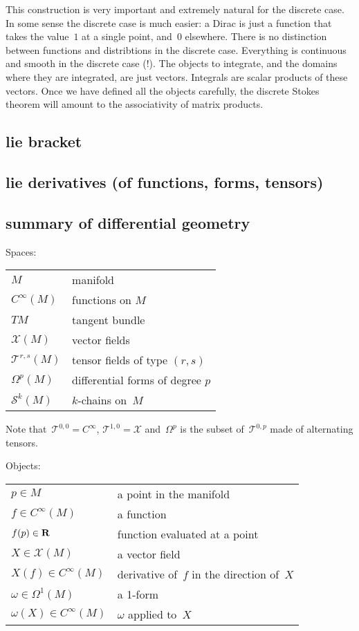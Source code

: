 This construction is very important and extremely natural for the discrete case.
In some sense the discrete case is much easier: a Dirac is just a function
that takes the value~$1$ at a single point, and~$0$ elsewhere.  There is no
distinction between functions and distribtions in the discrete case.
Everything is continuous and smooth in the discrete case (!).
The objects to integrate, and the domains where they are integrated, are just
vectors.
Integrals are
scalar products of these vectors.   Once we have
defined all the objects carefully, the discrete Stokes theorem will amount to
the associativity of matrix products.

\subsection{lie bracket}



\subsection{lie derivatives (of functions, forms, tensors)}

\clearpage
\subsection{summary of differential geometry}

Spaces:

\begin{tabular}{l|l}
	\hline
	$M$ & manifold \\
	$C^\infty(M)$ & functions on $M$ \\
	$TM$ & tangent bundle \\
	$\mathcal{X}(M)$ & vector fields \\
	$\mathcal{T}^{r,s}(M)$ & tensor fields of type $(r,s)$ \\
	$\Omega^p(M)$ & differential forms of degree $p$\\
	$\mathcal{S}^k(M)$ & $k$-chains on~$M$
\end{tabular}

Note that~$\mathcal{T}^{0,0}=C^\infty$,
$\mathcal{T}^{1,0}=\mathcal{X}$ and~$\Omega^p$ is the subset
of~$\mathcal{T}^{0,p}$ made of alternating tensors.


\bigskip

Objects:

\begin{tabular}{l|l}
	\hline
	$p\in M$ & a point in the manifold \\
	$f\in C^\infty(M)$ &a function \\
	$f(p)\in\mathbf{R}$ & function evaluated at a point \\
	$X\in \mathcal{X}(M)$ & a vector field \\
	$X(f)\in C^\infty(M)$ & derivative of~$f$ in the direction of~$X$ \\
	$\omega\in \Omega^1(M)$ & a 1-form \\
	$\omega(X)\in C^\infty(M)$ & $\omega$ applied to~$X$ \\
\end{tabular}


